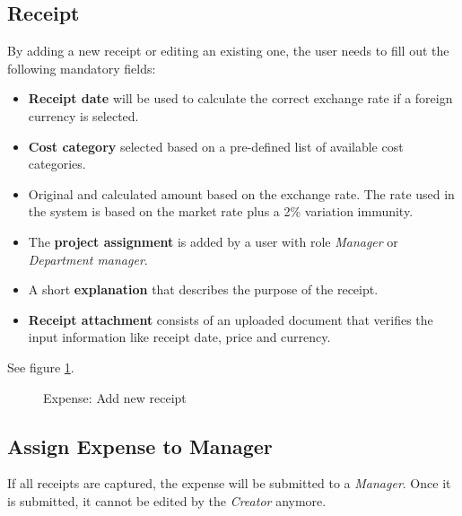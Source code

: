 \subsection{Receipt}
\label{sec:addreceipt}
By adding a new receipt or editing an existing one, the user needs to fill out the following mandatory fields:
\begin{itemize}
    \item \textbf{Receipt date} will be used to calculate the correct exchange rate if a foreign currency is selected.
    \item \textbf{Cost category} selected based on a pre-defined list of available cost categories.
    \item Original and calculated amount based on the exchange rate. The rate used in the system is based on the market rate plus a 2\% variation immunity.

    \item The \textbf{project assignment} is added by a user with role \textit{Manager} or \textit{Department manager}.
    \item A short \textbf{explanation} that describes the purpose of the receipt.
    \item \textbf{Receipt attachment} consists of an uploaded document that verifies the input information like receipt date, price and currency.
\end{itemize}

See figure \ref{fig:expenses-add01}.


\begin{figure}[H]
    \centering
    \caption{Expense: Add new receipt}
    \label{fig:expenses-add01}
\end{figure}

\subsection{Assign Expense to Manager}
If all receipts are captured, the expense will be submitted to a \textit{Manager}. Once it is submitted, it cannot be edited by the \textit{Creator} anymore.

